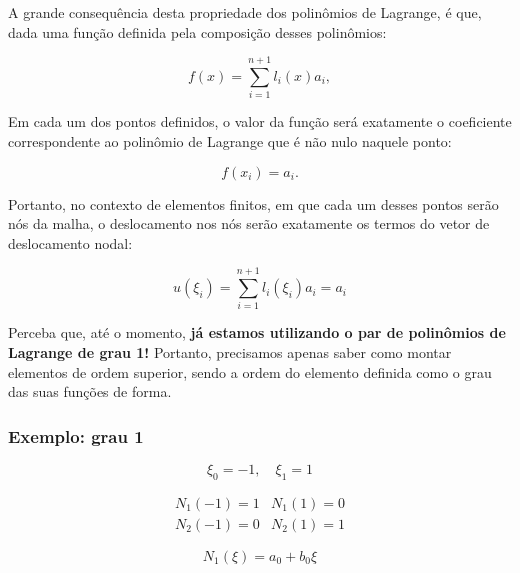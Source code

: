         A grande consequência desta propriedade dos polinômios de Lagrange, é que, dada uma função definida pela composição desses polinômios:

        \begin{equation}
            f(x) = \sum\limits_{i=1}^{n+1} l_i(x) a_i,
        \end{equation}

        Em cada um dos pontos definidos, o valor da função será exatamente o coeficiente correspondente ao polinômio de Lagrange que é não nulo naquele ponto:

        \begin{equation}
            f(x_i) = a_i.
        \end{equation}

        Portanto, no contexto de elementos finitos, em que cada um desses pontos serão nós da malha, o deslocamento nos nós serão exatamente os termos do vetor de deslocamento nodal:

        \begin{equation}
            u(\xi_i) = \sum\limits_{i=1}^{n+1} l_i(\xi_i) a_i = a_i 
        \end{equation}

        Perceba que, até o momento, \textbf{já estamos utilizando o par de polinômios de Lagrange de grau 1!} Portanto, precisamos apenas saber como montar elementos de ordem superior, sendo a ordem do elemento definida como o grau das suas funções de forma.

        \subsubsection*{Exemplo: grau 1}

        \begin{equation*}
                \xi_0 = -1, \quad \xi_1 = 1
            \end{equation*}

        \begin{equation*}
            \begin{array}{cc}
                N_1(-1) = 1 & N_1(1) = 0\\
                N_2(-1) = 0 & N_2(1) = 1
            \end{array}
        \end{equation*}

        \begin{equation*}
            N_1(\xi) = a_0 + b_0 \xi
        \end{equation*}

